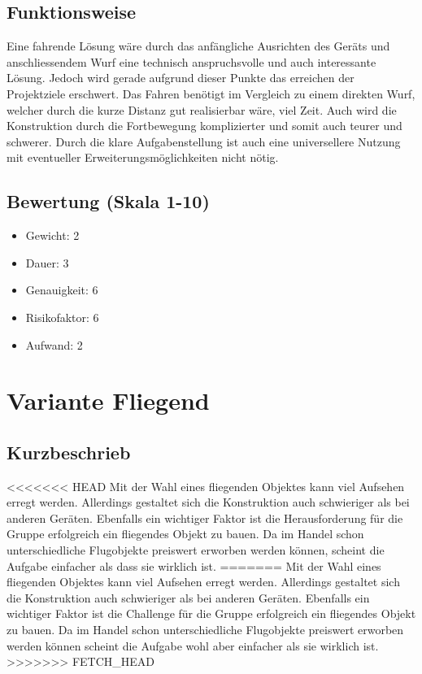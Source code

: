 \begin{landscape}
\subsection{Funktionsweise}
Eine fahrende Lösung wäre durch das anfängliche Ausrichten des Geräts und anschliessendem Wurf eine technisch anspruchsvolle und auch interessante Lösung. Jedoch wird gerade aufgrund dieser Punkte das erreichen der Projektziele erschwert. Das Fahren benötigt im Vergleich zu einem direkten Wurf, welcher durch die kurze Distanz gut realisierbar wäre, viel Zeit. Auch wird die Konstruktion durch die Fortbewegung komplizierter und somit auch teurer und schwerer. Durch die klare Aufgabenstellung ist auch eine universellere Nutzung mit eventueller Erweiterungsmöglichkeiten nicht nötig. 

\subsection{Bewertung (Skala 1-10)}
\begin{minipage}{\textwidth}
    \begin{itemize}
        \item Gewicht: 2
        \item Dauer: 3
        \item Genauigkeit: 6
        \item Risikofaktor: 6
        \item Aufwand: 2
    \end{itemize}
\end{minipage}

\clearpage

\section{Variante Fliegend}
\subsection{Kurzbeschrieb}
<<<<<<< HEAD
Mit der Wahl eines fliegenden Objektes kann viel Aufsehen erregt werden. Allerdings gestaltet sich die Konstruktion auch schwieriger als bei anderen Geräten. Ebenfalls ein wichtiger Faktor ist die Herausforderung für die Gruppe erfolgreich ein fliegendes Objekt zu bauen. Da im Handel schon unterschiedliche Flugobjekte preiswert erworben werden können, scheint die Aufgabe einfacher als dass sie wirklich ist.
=======
Mit der Wahl eines fliegenden Objektes kann viel Aufsehen erregt werden. Allerdings gestaltet sich die Konstruktion auch schwieriger als bei anderen Geräten. Ebenfalls ein wichtiger Faktor ist die Challenge für die Gruppe erfolgreich ein fliegendes Objekt zu bauen. Da im Handel schon unterschiedliche Flugobjekte preiswert erworben werden können scheint die Aufgabe wohl aber einfacher als sie wirklich ist.
>>>>>>> FETCH_HEAD


\end{landscape}
